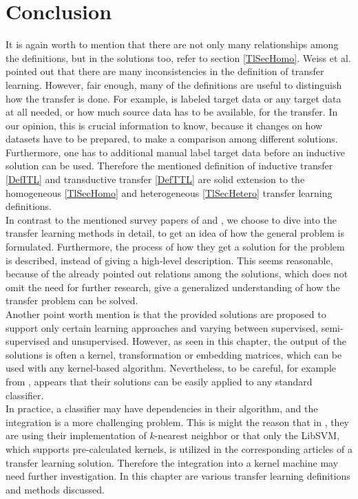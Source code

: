 \section{Conclusion}
It is again worth to mention that there are not only many relationships among the definitions, but in the solutions too, refer to section \ref{TlSecHomo}.
Weiss et al. pointed out that there are many inconsistencies in the definition of transfer learning.\cite[p. 5-6]{Weiss.2016}
However, fair enough, many of the definitions are useful to distinguish how the transfer is done.
For example, is labeled target data or any target data at all needed, or how much source data has to be available, for the transfer.
In our opinion, this is crucial information to know, because it changes on how datasets have to be prepared, to make a comparison among different solutions.
Furthermore, one has to additional manual label target data before an inductive solution can be used.
Therefore the mentioned definition of inductive transfer \ref{DefITL} and transductive transfer \ref{DefTTL} are solid extension to the homogeneous \ref{TlSecHomo} and heterogeneous \ref{TlSecHetero} transfer learning definitions.\\
In contrast to the mentioned survey papers of \cite{Weiss.2016} and \cite{Pan.2010}, we choose to dive into the transfer learning methods in detail, to get an idea of how the general problem is formulated.
Furthermore, the process of how they get a solution for the problem is described, instead of giving a high-level description.
This seems reasonable, because of the already pointed out relations among the solutions, which does not omit the need for further research, give a generalized understanding of how the transfer problem can be solved.\\
Another point worth mention is that the provided solutions are proposed to support only certain learning approaches and varying between supervised, semi-supervised and unsupervised.
However, as seen in this chapter, the output of the solutions is often a kernel, transformation or embedding matrices, which can be used with any kernel-based algorithm.
Nevertheless, to be careful, for example from \cite{Long.}, \cite{Long.2015} \cite{Gong.} appears that their solutions can be easily applied to any standard classifier.\\
In practice, a classifier may have dependencies in their algorithm, and the integration is a more challenging problem.
This is might the reason that in \cite{Gong.}, they are using their implementation of $k$-nearest neighbor or that only the LibSVM, which supports pre-calculated kernels, is utilized in the corresponding articles of a transfer learning solution. 
Therefore the integration into a kernel machine may need further investigation.
In this chapter are various transfer learning definitions and methods discussed.